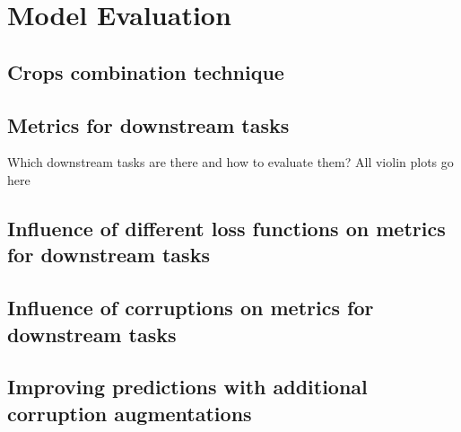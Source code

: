 \section{Model Evaluation}
    \subsection{Crops combination technique}
        
    \subsection{Metrics for downstream tasks}
        Which downstream tasks are there and how to evaluate them? All violin plots go here
    \subsection{Influence of different loss functions on metrics for downstream tasks}
    \subsection{Influence of corruptions on metrics for downstream tasks}
    \subsection{Improving predictions with additional corruption augmentations}
    